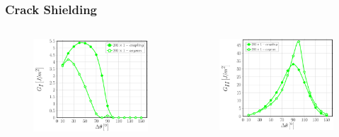 \documentclass[first,firstsupp,lastsupp,last,hyperref,table]{ETHclass}
\begin{document}
\begin{frame}
\frametitle{\vspace{0.2cm}\small Crack Shielding}
\vspace{-1cm}
\centering
\begin{columns}[c]
\centering
\begin{column}{0.5\textwidth}
\centering
\begin{figure}
\centering
\includegraphics[width=\columnwidth]{nx1-coupling-vf60-GI-crackshield201.pdf}
\end{figure}
\end{column}
\begin{column}{0.5\textwidth}
\centering
\begin{figure}
\centering
\includegraphics[width=\columnwidth]{nx1-coupling-vf60-GII-crackshield201.pdf}

\end{figure}
\end{column}
\end{columns}
\end{frame}
\end{document}
